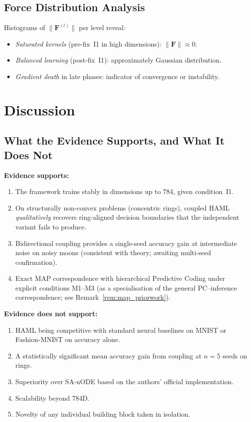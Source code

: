 \documentclass[11pt,a4paper]{article}
\begin{document}
\subsection{Force Distribution Analysis}

Histograms of $\|\mathbf{F}^{(l)}\|$ per level reveal:
\begin{itemize}
  \item \emph{Saturated kernels} (pre-fix~I1 in high dimensions): $\|\mathbf{F}\| \approx 0$.
  \item \emph{Balanced learning} (post-fix~I1): approximately Gaussian distribution.
  \item \emph{Gradient death} in late phases: indicator of convergence or instability.
\end{itemize}

\section{Discussion}

\subsection{What the Evidence Supports, and What It Does Not}

\textbf{Evidence supports:}
\begin{enumerate}
  \item The framework trains stably in dimensions up to 784, given condition~I1.
  \item On structurally non-convex problems (concentric rings), coupled HAML
        \emph{qualitatively} recovers ring-aligned decision boundaries that the
        independent variant fails to produce.
  \item Bidirectional coupling provides a single-seed accuracy gain at intermediate
        noise on noisy moons (consistent with theory; awaiting multi-seed confirmation).
  \item Exact MAP correspondence with hierarchical Predictive Coding under explicit
        conditions M1--M3 (as a specialisation of the general PC--inference
        correspondence; see Remark~\ref{rem:map_priorwork}).
\end{enumerate}

\textbf{Evidence does not support:}
\begin{enumerate}
  \item HAML being competitive with standard neural baselines on MNIST or Fashion-MNIST
        on accuracy alone.
  \item A statistically significant mean accuracy gain from coupling at $n=5$ seeds on
        rings.
  \item Superiority over SA-nODE based on the authors' official implementation.
  \item Scalability beyond 784D.
  \item Novelty of any individual building block taken in isolation.
\end{enumerate}
\end{document}
